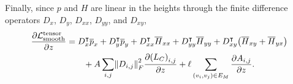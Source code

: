 Finally, since \(p\) and \(H\) are linear in the heights through the finite difference operators \(D_x\), \(D_y\), \(D_{xx}\), \(D_{yy}\), and \(D_{xy}\), \begin{align*}
	\frac{\partial \mathcal{L}_{\mathrm{smooth}}^{\text{tensor}}}{\partial z} &= D_x^\intercal \overline{p}_x + D_y^\intercal \overline{p}_y + D_{xx}^\intercal \overline{H}_{xx} + D_{yy}^\intercal \overline{H}_{yy} + D_{xy}^\intercal \pof{\overline{H}_{xy} + \overline{H}_{yx}} \\
		&\qquad+ A \sum_{i, j} \norm{D_{i, j}}_F^2 \frac{\partial \pof{L_C}_{i, j}}{\partial z} + \ell \sum_{\pof{v_i, v_j} \in E_M} \frac{\partial A_{i, j}}{\partial z}.
\end{align*}
